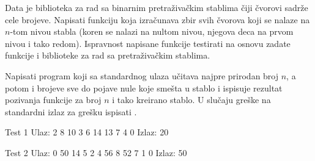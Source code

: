\begin{Exercise}[label=902]

Data je biblioteka za rad sa binarnim pretraživačkim stablima čiji čvorovi sadrže cele brojeve. 
Napisati funkciju   
koja izračunava zbir svih čvorova koji se nalaze na $n$-tom nivou stabla (koren se nalazi na nultom nivou, njegova deca na prvom nivou i tako redom). 
Ispravnost napisane funkcije testirati na osnovu zadate   funkcije i biblioteke za rad sa pretraživačkim stablima.

Napisati program koji sa standardnog ulaza učitava najpre prirodan broj $n$, a potom i brojeve sve do pojave nule koje smešta u stablo i ispisuje rezultat pozivanja funkcije  za broj $n$ i tako kreirano stablo. U slučaju greške na standardni izlaz za grešku ispisati .

\begin{miditest}
\begin{test}{Test 1}
 Ulaz:                                                        
  2 8 10 3 6 14 13 7 4 0     
 Izlaz:                                                  
  20                                                        
\end{test}
\end{miditest}
\begin{miditest}
\begin{test}{Test 2}
Ulaz:	                               
 0 50 14 5 2 4 56 8 52 7 1 0            
Izlaz:                               
 50                               
\end{test}
\end{miditest}

\end{Exercise}
\begin{Answer}[ref=902]
\end{Answer}

